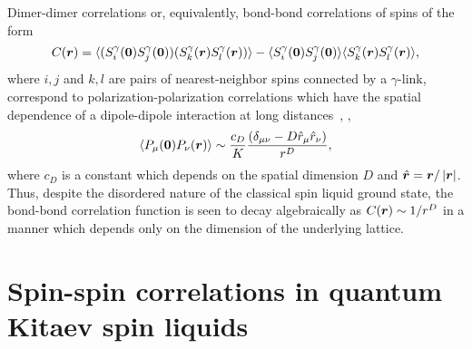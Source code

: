 Dimer-dimer correlations or, equivalently, bond-bond correlations of spins of the form
%
\begin{equation}
	C(\bm{r}) = \langle (S_i^{\gamma}(\bm{0}) S_j^{\gamma}(\bm{0}))(S_k^{\gamma}(\bm{r}) S_l^{\gamma}(\bm{r})) \rangle - \langle S_i^{\gamma}(\bm{0}) S_j^{\gamma}(\bm{0}) \rangle\langle S_k^{\gamma}(\bm{r}) S_l^{\gamma}(\bm{r}) \rangle,
\end{equation}
%
where $i,j$ and $k,l$ are pairs of nearest-neighbor spins connected by a $\gamma$-link, correspond to polarization-polarization correlations which have the spatial dependence of a dipole-dipole interaction at long distances~\cite{HenleyARCMP2010,ChandraPRE2010,SelaPRB2014}, \ie,
%
\begin{equation}
	\langle P_{\mu}(\bm{0}) P_{\nu}(\bm{r}) \rangle \sim \frac{c_D}{K} \frac{(\delta_{\mu\nu} - D \hat{r}_{\mu} \hat{r}_{\nu})}{r^D},
\end{equation}
%
where $c_D$ is a constant which depends on the spatial dimension $D$ and $\hat{\bm{r}} = \bm{r}/\left| \bm{r} \right|$.
Thus, despite the disordered nature of the classical spin liquid ground state, the bond-bond correlation function is seen to decay algebraically as $C(\bm{r}) \sim 1/r^D$ in a manner which depends only on the dimension of the underlying lattice.


%
%
\section{Spin-spin correlations in quantum Kitaev spin liquids}
\label{section:chapter07_SpinSpinCorrelations}
%
%
%
%
